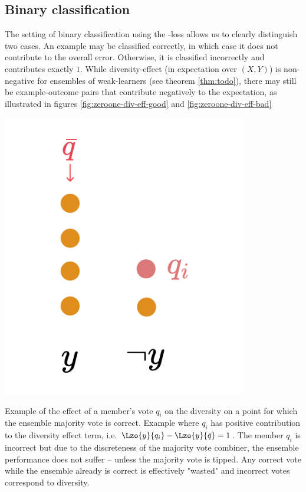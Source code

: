 \documentclass[../main.tex]{subfiles}
\begin{document}
\subsection{Binary classification}


The setting of binary classification using the \zeroone-loss allows us to clearly distinguish two cases. An example may be classified correctly, in which case it does not contribute to the overall error. Otherwise, it is classified incorrectly and contributes exactly $1$.
While diversity-effect (in expectation over $(X,Y)$) is non-negative for ensembles of weak-learners (see theorem \ref{thm:todo}), there may still be example-outcome pairs that contribute negatively to the expectation, as illustrated in figures \ref{fig:zeroone-div-eff-good} and \ref{fig:zeroone-div-eff-bad}

\begin{marginfigure}
    \label{fig:zeroone-div-eff-good}
    \includegraphics[width=0.8\textwidth]{figma-illustrations/zeroone-div-effect-good.pdf}
    \caption{
        Example of the effect of a member's vote $q_i$ on the diversity on a point for which the ensemble majority vote is correct.
    Example where $q_i$ has positive contribution to the diversity effect term, i.e. 
$\Lzo{y}{q_{i}} - \Lzo{y}{\bar{q}} = 1$. The member $q_{i}$ is incorrect but due to the discreteness of the majority vote combiner, the ensemble performance does not suffer -- unless the majority vote is tipped. Any correct vote while the ensemble already is correct is effectively "wasted" and incorrect votes correspond to diversity.
}
\end{marginfigure}
\end{document}
